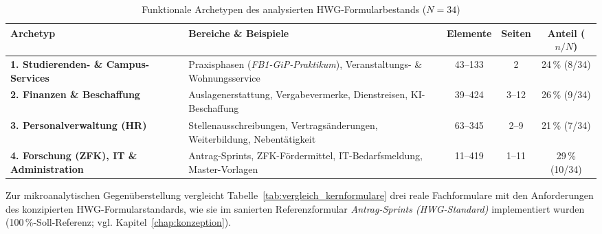 \begin{table}[htbp]
\centering
\small
\begin{tabularx}{\textwidth}{>{\raggedright\arraybackslash}p{3.6cm}>{\raggedright\arraybackslash}Xccc}
\toprule
\textbf{Archetyp} & \textbf{Bereiche \& Beispiele} & \textbf{Elemente} & \textbf{Seiten} & \textbf{Anteil ($n / N$)} \\
\midrule
\textbf{1. Studierenden- \& Campus-Services} & Praxisphasen (\textit{FB1-GiP-Praktikum}), Veranstaltungs- \& Wohnungsservice & 43--133 & 2 & 24\,\% (8/34) \\
\textbf{2. Finanzen \& Beschaffung} & Auslagenerstattung, Vergabevermerke, Dienstreisen, KI-Beschaffung & 39--424 & 3--12 & 26\,\% (9/34) \\
\textbf{3. Personalverwaltung (HR)} & Stellenausschreibungen, Vertragsänderungen, Weiterbildung, Nebentätigkeit & 63--345 & 2--9 & 21\,\% (7/34) \\
\textbf{4. Forschung (ZFK), IT \& Administration} & Antrag-Sprints, ZFK-Fördermittel, IT-Bedarfsmeldung, Master-Vorlagen & 11--419 & 1--11 & 29\,\% (10/34) \\
\bottomrule
\end{tabularx}
\caption{Funktionale Archetypen des analysierten HWG-Formularbestands ($N = 34$)}
\label{tab:archetypen}
\end{table}

Zur mikroanalytischen Gegenüberstellung vergleicht Tabelle~\ref{tab:vergleich_kernformulare} drei reale Fachformulare mit den Anforderungen des konzipierten HWG-Formularstandards, wie sie im sanierten Referenzformular \textit{Antrag-Sprints (HWG-Standard)} implementiert wurden (100\,\%-Soll-Referenz; vgl. Kapitel~\ref{chap:konzeption}).

